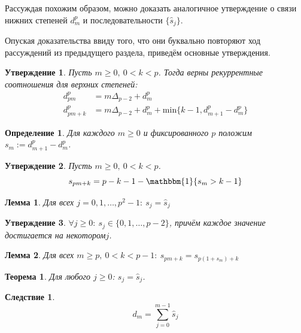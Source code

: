 \documentclass[14pt, a4paper, russian]{report}
\newtheorem{lemma}{\indent Лемма}
\newtheorem{theorem}{\indent Теорема}
\newtheorem{corollary}{\indent Следствие}
\newtheorem{definition}{\indent Определение}
\newtheorem{proposition}{\indent Утверждение}
\begin{document}
Рассуждая похожим образом, можно доказать аналогичное утверждение о связи нижних степеней $d_m^p$ и последовательности $\{\hat{s}_j\}$.

Опуская доказательства ввиду того, что они буквально повторяют ход рассуждений из предыдущего раздела, приведём основные утверждения.

\begin{proposition}
Пусть $m \ge 0,\ 0 < k < p$. Тогда верны рекуррентные соотношения для верхних степеней:
\begin{align*}
  d_{pm}^p &= m \Delta_{p-2} + d_m^p \\
  d_{pm+k}^p &= m \Delta_{p-2}+d_m^p + \mathrm{min}\{k-1, d_{m+1}^p-d_m^p\}
\end{align*}
\end{proposition}
\begin{definition}
Для каждого $m \ge 0$ и фиксированного $p$ положим $s_m := d_{m+1}^p - d_m^p $.
\end{definition}
\begin{proposition}
Пусть $m \ge 0,\ 0 < k < p$. 
\begin{equation}
s_{pm+k} = p-k-1 - \mathbbm{1}\{s_m > k-1\}
\end{equation}
\end{proposition}
\begin{lemma}
Для всех $j = 0, 1, \ldots, p^2-1:\ s_j=\hat{s}_j$
\end{lemma}
\begin{proposition}
$\forall j \ge 0:\ s_j \in \{0, 1, \ldots, p-2\}$, причём каждое значение достигается на некотором\nobreakspace$j$.
\end{proposition}
\begin{lemma}
Для всех $m \ge p,\ 0 < k < p-1:\ s_{pm+k}=s_{p(1+s_m)+k}$
\end{lemma}
\begin{theorem}
Для любого $j \ge 0$: $s_j=\hat{s}_j$.
\end{theorem}
\begin{corollary}\label{d_sum}
$$d_m = \sum\limits_{j=0}^{m-1} \hat{s}_j$$
\end{corollary}
\end{document}
